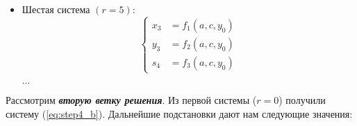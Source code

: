 \begin{itemize}
\item Шестая система $ (r = 5) $:
\begin{equation*}
\left\{
	\begin{aligned}
		x_3 &= f_1(a,c,y_0) \\
		y_3 &= f_2(a,c,y_0) \\
		s_4 &= f_3(a,c,y_0)
	\end{aligned}
\right.
\end{equation*}

\begin{center}
	$ \ldots $
\end{center}

\end{itemize}
\newpage

Рассмотрим \textit{\textbf{вторую ветку решения}}. Из первой системы ($ r = 0 $) получили систему (\ref{eq:step4_b}).
Дальнейшие подстановки дают нам следующие значения:
